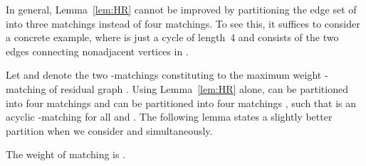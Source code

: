 \documentclass[11pt,twoside]{article}\usepackage{amssymb,latexsym,graphicx,hyperref}\usepackage{epstopdf}
\begin{document}
In general, Lemma~\ref{lem:HR} cannot be improved by partitioning the edge set of 
 into three matchings instead of four matchings. To see this, it suffices to 
consider a concrete example, where  is just a cycle of length~4 and 
 consists of the two edges connecting nonadjacent vertices in .


Let  and  denote the two -matchings constituting to the maximum weight -matching  of residual graph .
Using Lemma~\ref{lem:HR} alone,  can be partitioned into four matchings  and
 can be partitioned into four matchings ,
such that  is an acyclic -matching for all  and .
The following lemma states a slightly better partition when we consider  and  simultaneously.


\begin{lemma}
\label{lemma41}
The weight of matching  is .
\end{lemma}
\end{document}
